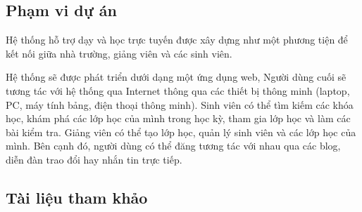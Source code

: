 \documentclass[./../main_file.tex]{subfiles}
\begin{document}
\subsection{Phạm vi dự án}

Hệ thống hỗ trợ dạy và học trực tuyến được xây dựng như một phương tiện để kết nối giữa nhà trường, giảng viên và các sinh viên. 


Hệ thống sẽ được phát triển dưới dạng một ứng dụng web, Người dùng cuối sẽ tương tác với hệ thống qua Internet thông qua các thiết bị thông minh (laptop, PC, máy tính bảng, điện thoại thông minh). Sinh viên có thể tìm kiếm các khóa học, khám phá các lớp học của mình trong học kỳ, tham gia lớp học và làm các bài kiểm tra. Giảng viên có thể tạo lớp học, quản lý sinh viên và các lớp học của mình. Bên cạnh đó, người dùng có thể đăng tương tác với nhau qua các blog, diễn đàn trao đổi hay nhắn tin trực tiếp.


\subsection{Tài liệu tham khảo}
\nocite{*}
\printbibliography[heading=none]

\clearpage
\end{document}
